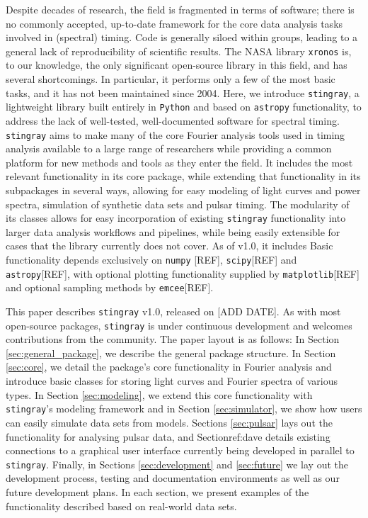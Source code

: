 \documentclass[12pt]{emulateapj}
\newcommand{\stingray}{\texttt{stingray}\xspace}
\newcommand{\python}{\texttt{Python}\xspace}
\newcommand{\astropy}{\texttt{astropy}\xspace}
\begin{document}
Despite decades of research, the field is fragmented in terms of software; there is no commonly accepted, up-to-date framework for the core data analysis tasks involved in (spectral) timing. Code is generally siloed within groups, leading to a general lack of reproducibility of scientific results. 
The NASA library \texttt{xronos} is, to our knowledge, the only significant open-source library in this field, and has several shortcomings. 
In particular, it performs only a few of the most basic tasks, and it has not been maintained since 2004. 
Here, we introduce \stingray, a lightweight library built entirely in \python and based on \astropy functionality, to address the lack of well-tested, well-documented software for spectral timing. 
\stingray aims to make many of the core Fourier analysis tools used in timing analysis available to a large range of researchers while providing a common platform for new methods and tools as they enter the field. 
It includes the most relevant functionality in its core package, while extending that functionality in its subpackages in several ways, allowing for easy modeling of light curves and power spectra, simulation of synthetic data sets and pulsar timing. 
The modularity of its classes allows for easy incorporation of existing \stingray functionality into larger data analysis workflows and pipelines, while being easily extensible for cases that the library currently does not cover. 
As of v1.0, it includes Basic functionality depends exclusively on \texttt{numpy} [REF], \texttt{scipy}[REF] and \texttt{astropy}[REF], with optional plotting functionality supplied by \texttt{matplotlib}[REF] and optional sampling methods by \texttt{emcee}[REF].

This paper describes \stingray v1.0, released on [ADD DATE]. 
As with most open-source packages, \stingray is under continuous development and welcomes contributions from the community.
The paper layout is as follows: 
In Section \ref{sec:general_package}, we describe the general package structure. 
In Section \ref{sec:core}, we detail the package's core functionality in Fourier analysis and introduce basic classes for storing light curves and Fourier spectra of various types. 
In Section \ref{sec:modeling}, we extend this core functionality with \stingray's modeling framework and in Section \ref{sec:simulator}, we show how users can easily simulate data sets from models. 
Sections \ref{sec:pulsar} lays out the functionality for analysing pulsar data, and Section{ref:dave} details existing connections to a graphical user interface currently being developed in parallel to \stingray. 
Finally, in Sections \ref{sec:development} and \ref{sec:future} we lay out the development process, testing and documentation environments as well as our future development plans. 
In each section, we present examples of the functionality described based on real-world data sets.
\end{document}
